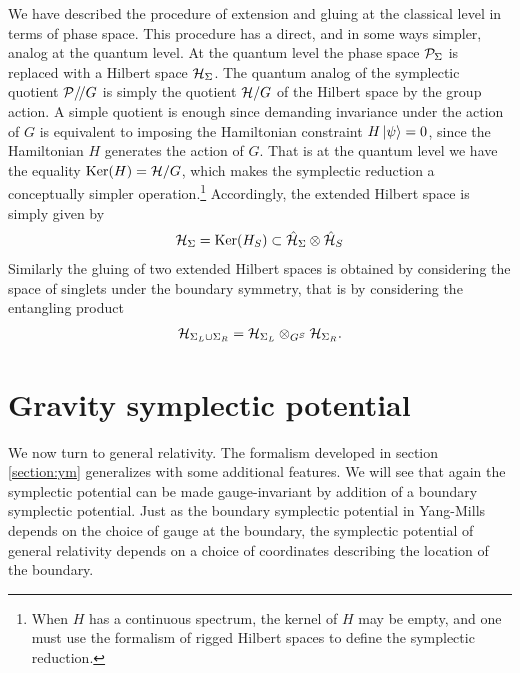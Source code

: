 \documentclass[a4paper,11pt]{article}
\newcommand{\beq}{\begin{eqnarray}}
\newcommand{\eeq}{\end{eqnarray}}
\DeclareMathOperator{\Ker}{Ker}
\begin{document}
We have described the procedure of extension and gluing at the classical level in terms of phase space. This procedure has a direct, and in some ways simpler, analog at the quantum level.
At the quantum level the phase space ${\cal P}_{\Sigma}$ is replaced with a Hilbert space ${\cal H}_\Sigma$. 
The quantum analog of the symplectic quotient ${\cal P}/\!/ G$ is simply the quotient ${\cal H}/G$ of the Hilbert space by the group action.
A simple quotient is enough since demanding invariance under the action of $G$ is equivalent to imposing the Hamiltonian constraint $H \ket{\psi} = 0$, since the Hamiltonian $H$ generates the action of $G$. 
That is at the quantum level we have the equality $\Ker(H)= {\cal H}/G$, which makes the symplectic reduction a conceptually  simpler operation.\footnote{When $H$ has a continuous spectrum, the kernel of $H$ may be empty, and one must use the formalism of rigged Hilbert spaces \cite{Giulini:1998rk} to define the symplectic reduction.}
Accordingly, the extended Hilbert space is simply given by 
\beq 
{\cal H}_{{\Sigma}} =
\Ker(H_S) \subset \hat{\cal H}_{{\Sigma}} \otimes \hat{\cal H}_{{S}}
\eeq
Similarly the gluing of two extended Hilbert spaces is obtained by considering the space of singlets under the boundary symmetry, that is by considering the entangling product
\beq
{\cal H}_{\Sigma_L\cup \Sigma_R} = 
{\cal H}_{\Sigma_L} \otimes_{G^S} 
{\cal H}_{ \Sigma_R}.
\eeq

\section{Gravity symplectic potential} \label{section:gr}

We now turn to general relativity.
The formalism developed in section \ref{section:ym} generalizes with some additional features.
We will see that again the symplectic potential can be made gauge-invariant by addition of a boundary symplectic potential.
Just as the boundary symplectic potential in Yang-Mills depends on the choice of gauge at the boundary, the symplectic potential of general relativity depends on a choice of coordinates describing the location of the boundary.
\end{document}
